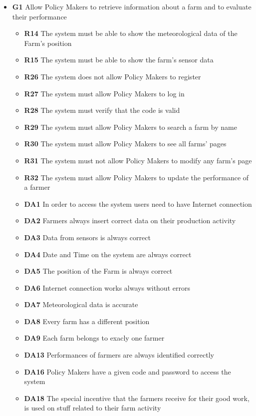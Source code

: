 \begin{itemize}   
    \item \textbf{G1} Allow Policy Makers to retrieve information about a farm and to evaluate their performance
        \begin{itemize}
            \renewcommand\labelitemi{--}
            \item \textbf{R14} The system must be able to show the meteorological data of the Farm’s position
            \item \textbf{R15} The system must be able to show the farm’s sensor data
            \item \textbf{R26} The system does not allow Policy Makers to register
            \item \textbf{R27} The system must allow Policy Makers to log in
            \item \textbf{R28} The system must verify that the code is valid
            \item \textbf{R29} The system must allow Policy Makers to search a farm by name
            \item \textbf{R30} The system must allow Policy Makers to see all farms’ pages
            \item \textbf{R31} The system must not allow Policy Makers to modify any farm’s page
            \item \textbf{R32} The system must allow Policy Makers to update the performance of a farmer
            \item \textbf{DA1} In order to access the system users need to have Internet connection
            \item \textbf{DA2} Farmers always insert correct data on their production activity
            \item \textbf{DA3} Data from sensors is always correct
            \item \textbf{DA4} Date and Time on the system are always correct
            \item \textbf{DA5} The position of the Farm is always correct
            \item \textbf{DA6} Internet connection works always without errors
            \item \textbf{DA7} Meteorological data is accurate
            \item \textbf{DA8} Every farm has a different position
            \item \textbf{DA9} Each farm belongs to exacly one farmer
            \item \textbf{DA13} Performances of farmers are always identified correctly
            \item \textbf{DA16} Policy Makers have a given code and password to access the system
            \item \textbf{DA18} The special incentive that the farmers receive for their good work, is used on stuff related to their farm activity
        \end{itemize}
    

\end{itemize}
